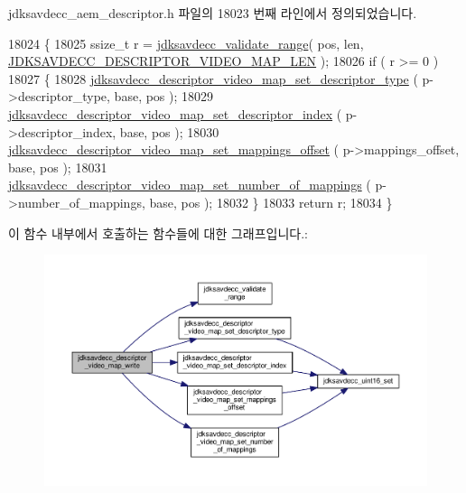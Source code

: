 jdksavdecc\+\_\+aem\+\_\+descriptor.\+h 파일의 18023 번째 라인에서 정의되었습니다.


\begin{DoxyCode}
18024 \{
18025     ssize\_t r = \hyperlink{group__util_ga9c02bdfe76c69163647c3196db7a73a1}{jdksavdecc\_validate\_range}( pos, len, 
      \hyperlink{group__descriptor__video__map_gae5c0ae299ea04d5b4fea8f932bf1c268}{JDKSAVDECC\_DESCRIPTOR\_VIDEO\_MAP\_LEN} );
18026     \textcolor{keywordflow}{if} ( r >= 0 )
18027     \{
18028         \hyperlink{group__descriptor__video__map_ga795d311fdf631cb5195891d231bae1af}{jdksavdecc\_descriptor\_video\_map\_set\_descriptor\_type}
      ( p->descriptor\_type, base, pos );
18029         \hyperlink{group__descriptor__video__map_ga855bc95bb9268073111c983176bf61c9}{jdksavdecc\_descriptor\_video\_map\_set\_descriptor\_index}
      ( p->descriptor\_index, base, pos );
18030         \hyperlink{group__descriptor__video__map_ga87847b4eaa2bc998af1f77efb81cde8a}{jdksavdecc\_descriptor\_video\_map\_set\_mappings\_offset}
      ( p->mappings\_offset, base, pos );
18031         \hyperlink{group__descriptor__video__map_ga19a122dc1995abd7de5fd15f354b40d1}{jdksavdecc\_descriptor\_video\_map\_set\_number\_of\_mappings}
      ( p->number\_of\_mappings, base, pos );
18032     \}
18033     \textcolor{keywordflow}{return} r;
18034 \}
\end{DoxyCode}


이 함수 내부에서 호출하는 함수들에 대한 그래프입니다.\+:
\nopagebreak
\begin{figure}[H]
\begin{center}
\leavevmode
\includegraphics[width=350pt]{group__descriptor__video__map_ga7a7eed2548c797b0ed8db1e33bb77c9a_cgraph}
\end{center}
\end{figure}


